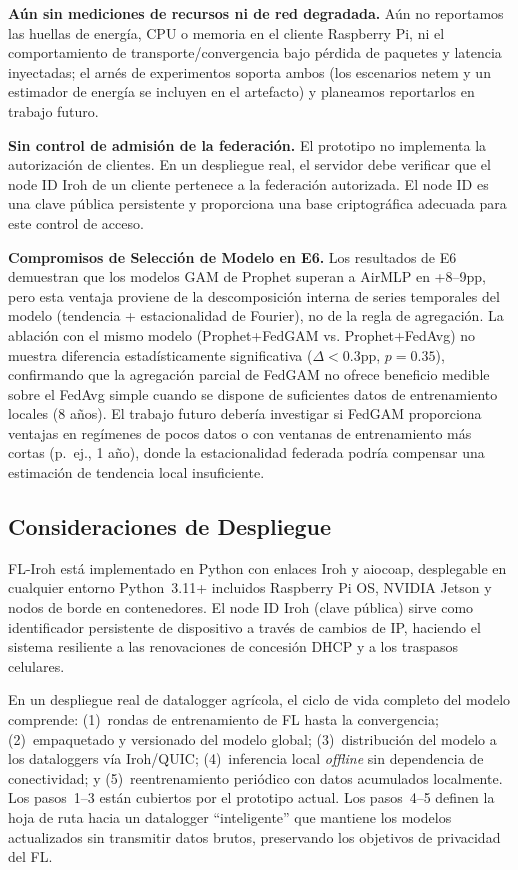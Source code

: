 \documentclass[journal]{IEEEtran}
\begin{document}
\textbf{Aún sin mediciones de recursos ni de red degradada.} Aún no reportamos las huellas de energía, CPU o memoria en el cliente Raspberry Pi, ni el comportamiento de transporte/convergencia bajo pérdida de paquetes y latencia inyectadas; el arnés de experimentos soporta ambos (los escenarios netem y un estimador de energía se incluyen en el artefacto) y planeamos reportarlos en trabajo futuro.

\textbf{Sin control de admisión de la federación.} El prototipo no implementa la autorización de clientes. En un despliegue real, el servidor debe verificar que el node ID Iroh de un cliente pertenece a la federación autorizada. El node ID es una clave pública persistente y proporciona una base criptográfica adecuada para este control de acceso.

\textbf{Compromisos de Selección de Modelo en E6.} Los resultados de E6 demuestran que los modelos GAM de Prophet superan a AirMLP en +8--9pp, pero esta ventaja proviene de la descomposición interna de series temporales del modelo (tendencia + estacionalidad de Fourier), no de la regla de agregación. La ablación con el mismo modelo (Prophet+FedGAM vs. Prophet+FedAvg) no muestra diferencia estadísticamente significativa ($\Delta{<}0.3$pp, $p{=}0.35$), confirmando que la agregación parcial de FedGAM no ofrece beneficio medible sobre el FedAvg simple cuando se dispone de suficientes datos de entrenamiento locales (8 años). El trabajo futuro debería investigar si FedGAM proporciona ventajas en regímenes de pocos datos o con ventanas de entrenamiento más cortas (p.~ej., 1 año), donde la estacionalidad federada podría compensar una estimación de tendencia local insuficiente.

\subsection{Consideraciones de Despliegue}

FL-Iroh está implementado en Python con enlaces Iroh y aiocoap, desplegable en cualquier entorno Python~3.11+ incluidos Raspberry Pi OS, NVIDIA Jetson y nodos de borde en contenedores. El node ID Iroh (clave pública) sirve como identificador persistente de dispositivo a través de cambios de IP, haciendo el sistema resiliente a las renovaciones de concesión DHCP y a los traspasos celulares.

En un despliegue real de datalogger agrícola, el ciclo de vida completo del modelo comprende: (1)~rondas de entrenamiento de FL hasta la convergencia; (2)~empaquetado y versionado del modelo global; (3)~distribución del modelo a los dataloggers vía Iroh/QUIC; (4)~inferencia local \emph{offline} sin dependencia de conectividad; y (5)~reentrenamiento periódico con datos acumulados localmente. Los pasos~1--3 están cubiertos por el prototipo actual. Los pasos~4--5 definen la hoja de ruta hacia un datalogger ``inteligente'' que mantiene los modelos actualizados sin transmitir datos brutos, preservando los objetivos de privacidad del FL.
\end{document}
